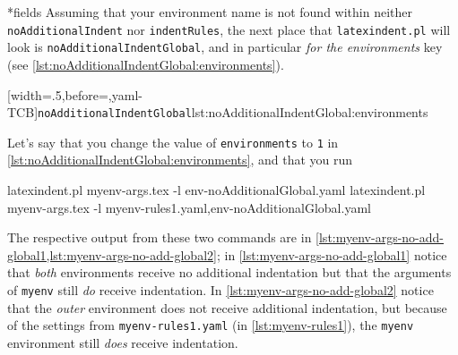 *{fields}
 Assuming that your environment name is not found within neither
 \texttt{noAdditionalIndent} nor \texttt{indentRules}, the next place that
 \texttt{latexindent.pl} will look is \texttt{noAdditionalIndentGlobal}, and in particular
 \emph{for the environments} key (see \cref{lst:noAdditionalIndentGlobal:environments}).

 [width=.5\linewidth,before=\centering,yaml-TCB]{\texttt{noAdditionalIndentGlobal}}{lst:noAdditionalIndentGlobal:environments}

 \begin{example}
 Let's say that you change the value of \texttt{environments} to \texttt{1} in
 \cref{lst:noAdditionalIndentGlobal:environments}, and that you run 

 \begin{widepage}

  \begin{commandshell}
latexindent.pl myenv-args.tex -l env-noAdditionalGlobal.yaml
latexindent.pl myenv-args.tex -l myenv-rules1.yaml,env-noAdditionalGlobal.yaml
\end{commandshell}

 \end{widepage}

 The respective output from these two commands are in
 \cref{lst:myenv-args-no-add-global1,lst:myenv-args-no-add-global2}; in
 \cref{lst:myenv-args-no-add-global1} notice that \emph{both} environments receive no
 additional indentation but that the arguments of \texttt{myenv} still \emph{do} receive
 indentation. In \cref{lst:myenv-args-no-add-global2} notice that the \emph{outer}
 environment does not receive additional indentation, but because of the settings from
 \texttt{myenv-rules1.yaml} (in \vref{lst:myenv-rules1}), the \texttt{myenv} environment
 still \emph{does} receive indentation.

 \begin{cmhtcbraster}
 \end{cmhtcbraster}
 \end{example}

